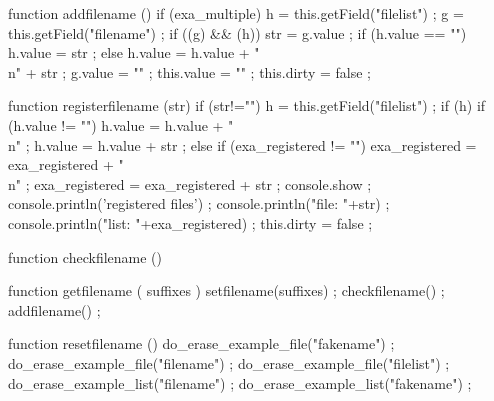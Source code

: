    function addfilename () {
        if (exa_multiple) {
            h = this.getField("filelist") ;
            g = this.getField("filename") ;
            if ((g) && (h)) {
                str = g.value ;
                if (h.value == "") {
                    h.value = str ;
                } else {
                    h.value = h.value + "\\n" + str ;
                }
                g.value = "" ;
                this.value = "" ;
            }
        }
        this.dirty = false ;
    }


    function registerfilename (str) {
        if (str!="") {
            h = this.getField("filelist") ;
            if (h) {
                if (h.value != "") {
                    h.value = h.value + "\\n" ;
                }
                h.value = h.value + str ;
            } else {
                if (exa_registered != "") {
                    exa_registered = exa_registered + "\\n" ;
                }
                exa_registered = exa_registered + str ;
            }
        }
        console.show ;
        console.println('registered files') ;
        console.println("file: "+str) ;
        console.println("list: "+exa_registered) ;
        this.dirty = false ;
    }

    function checkfilename () {
    }

    function getfilename ( suffixes ) {
        setfilename(suffixes) ;
        checkfilename() ;
        addfilename() ;
    }

    function resetfilename () {
        do_erase_example_file("fakename") ;
        do_erase_example_file("filename") ;
        do_erase_example_file("filelist") ;
        do_erase_example_list("filename") ;
        do_erase_example_list("fakename") ;
    }

\stopJSpreamble

\endinput